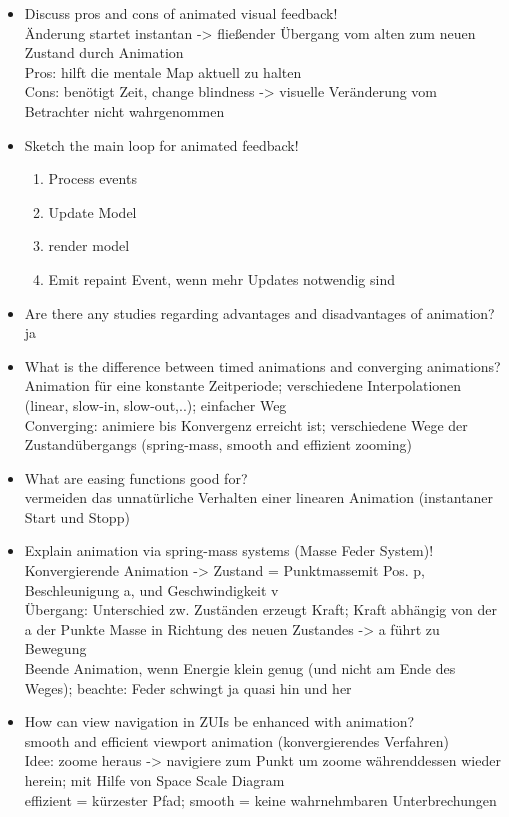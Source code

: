 \begin{itemize}
	\item Discuss pros and cons of animated visual feedback!\\
	Änderung startet instantan -> fließender Übergang vom alten zum neuen Zustand durch Animation\\
	Pros: hilft die mentale Map aktuell zu halten\\
	Cons: benötigt Zeit, change blindness -> visuelle Veränderung vom Betrachter nicht wahrgenommen
	
	\item Sketch the main loop for animated feedback!
	\begin{enumerate}
		\item Process events
		\item Update Model
		\item render model
		\item Emit repaint Event, wenn mehr Updates notwendig sind
	\end{enumerate}
	
	\item Are there any studies regarding advantages and disadvantages of animation? ja
	
	\item What is the difference between timed animations and converging animations?
	Animation für eine konstante Zeitperiode; verschiedene Interpolationen (linear, slow-in, slow-out,..); einfacher Weg\\
	Converging: animiere bis Konvergenz erreicht ist; verschiedene Wege der Zustandübergangs (spring-mass, smooth and effizient zooming)
	
	\item What are easing functions good for?\\
	vermeiden das unnatürliche Verhalten einer linearen Animation (instantaner Start und Stopp)
	
	\item Explain animation via spring-mass systems (Masse Feder System)!\\
	Konvergierende Animation -> Zustand = Punktmassemit Pos. p, Beschleunigung a, und Geschwindigkeit v\\
	Übergang: Unterschied zw. Zuständen erzeugt Kraft; Kraft abhängig von der a der Punkte Masse in Richtung des neuen Zustandes -> a führt zu Bewegung\\
	Beende Animation, wenn Energie klein genug (und nicht am Ende des Weges); beachte: Feder schwingt ja quasi hin und her
	
	\item How can view navigation in ZUIs be enhanced with animation?\\
	smooth and efficient viewport animation (konvergierendes Verfahren)\\
	Idee: zoome heraus -> navigiere zum Punkt um zoome währenddessen wieder herein; mit Hilfe von Space Scale Diagram\\
	effizient = kürzester Pfad; smooth = keine wahrnehmbaren Unterbrechungen
	

\end{itemize}
